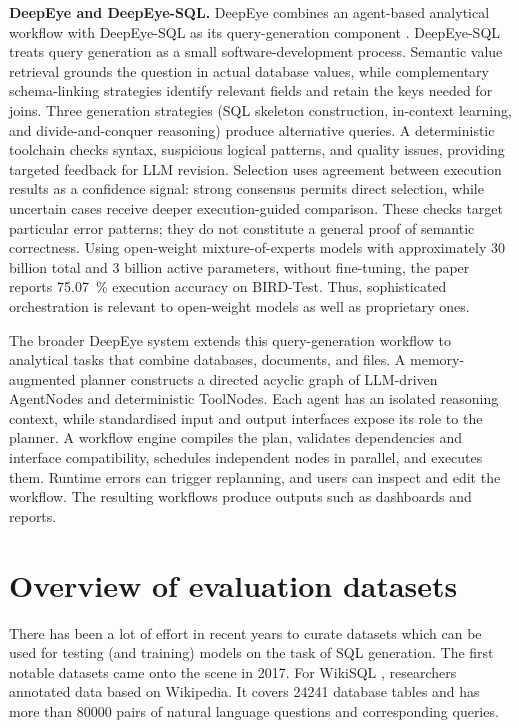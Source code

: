 \textbf{DeepEye and DeepEye-SQL.} DeepEye combines an agent-based analytical workflow with DeepEye-SQL as its
query-generation component \cite{li2026deepeye,li2026deepeyesql}. DeepEye-SQL treats query generation as a
small software-development process. Semantic value retrieval grounds the question in actual database values,
while complementary schema-linking strategies identify relevant fields and retain the keys needed for joins.
Three generation strategies (SQL skeleton construction, in-context learning, and divide-and-conquer
reasoning) produce alternative queries. A deterministic toolchain checks syntax, suspicious logical patterns,
and quality issues, providing targeted feedback for LLM revision. Selection uses agreement between execution
results as a confidence signal: strong consensus permits direct selection, while uncertain cases receive
deeper execution-guided comparison. These checks target particular error patterns; they do not constitute a
general proof of semantic correctness. Using open-weight mixture-of-experts models with approximately
\num{30} billion total and \num{3} billion active parameters, without fine-tuning, the paper reports
\qty{75.07}{\percent} execution accuracy on BIRD-Test. Thus, sophisticated orchestration is relevant to
open-weight models as well as proprietary ones.

The broader DeepEye system \cite{li2026deepeye} extends this query-generation workflow to analytical tasks
that combine databases, documents, and files. A memory-augmented planner constructs a directed acyclic graph
of LLM-driven AgentNodes and deterministic ToolNodes. Each agent has an isolated reasoning context, while
standardised input and output interfaces expose its role to the planner. A workflow engine compiles the plan,
validates dependencies and interface compatibility, schedules independent nodes in parallel, and executes
them. Runtime errors can trigger replanning, and users can inspect and edit the workflow. The resulting
workflows produce outputs such as dashboards and reports.

\section{Overview of evaluation datasets}

There has been a lot of effort in recent years to curate datasets which can be used for testing (and
training) models on the task of SQL generation. The first notable datasets came onto the scene in
\num[group-digits=none]{2017}. For WikiSQL \cite{zhong2017seq2sql}, researchers annotated data based on
Wikipedia. It covers \num{24241} database tables and has more than \num{80000} pairs of natural language
questions and corresponding queries.

